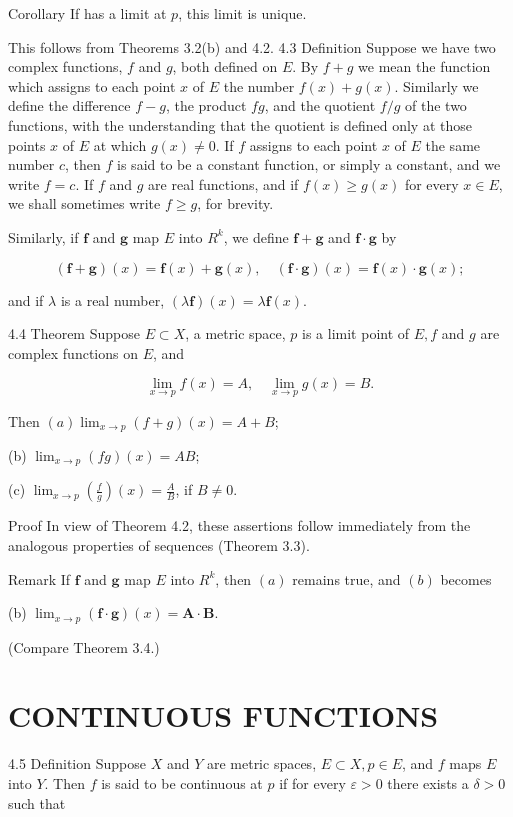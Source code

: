 \documentclass[10pt]{article}
\begin{document}
Corollary If has a limit at $p$, this limit is unique.

This follows from Theorems 3.2(b) and 4.2. 4.3 Definition Suppose we have two complex functions, $f$ and $g$, both defined on $E$. By $f+g$ we mean the function which assigns to each point $x$ of $E$ the number $f(x)+g(x)$. Similarly we define the difference $f-g$, the product $f g$, and the quotient $f / g$ of the two functions, with the understanding that the quotient is defined only at those points $x$ of $E$ at which $g(x) \neq 0$. If $f$ assigns to each point $x$ of $E$ the same number $c$, then $f$ is said to be a constant function, or simply a constant, and we write $f=c$. If $f$ and $g$ are real functions, and if $f(x) \geq g(x)$ for every $x \in E$, we shall sometimes write $f \geq g$, for brevity.

Similarly, if $\mathbf{f}$ and $\mathbf{g}$ map $E$ into $R^{k}$, we define $\mathbf{f}+\mathbf{g}$ and $\mathbf{f} \cdot \mathbf{g}$ by

$$
(\mathbf{f}+\mathbf{g})(x)=\mathbf{f}(x)+\mathbf{g}(x), \quad(\mathbf{f} \cdot \mathbf{g})(x)=\mathbf{f}(x) \cdot \mathbf{g}(x) ;
$$

and if $\lambda$ is a real number, $(\lambda \mathbf{f})(x)=\lambda \mathbf{f}(x)$.

4.4 Theorem Suppose $E \subset X$, a metric space, $p$ is a limit point of $E, f$ and $g$ are complex functions on $E$, and

$$
\lim _{x \rightarrow p} f(x)=A, \quad \lim _{x \rightarrow p} g(x)=B .
$$

Then $(a) \lim _{x \rightarrow p}(f+g)(x)=A+B$;

(b) $\lim _{x \rightarrow p}(f g)(x)=A B$;

(c) $\lim _{x \rightarrow p}\left(\frac{f}{g}\right)(x)=\frac{A}{B}$, if $B \neq 0$.

Proof In view of Theorem 4.2, these assertions follow immediately from the analogous properties of sequences (Theorem 3.3).

Remark If $\mathbf{f}$ and $\mathbf{g}$ map $E$ into $R^{k}$, then $(a)$ remains true, and $(b)$ becomes

(b) $\lim _{x \rightarrow p}(\mathbf{f} \cdot \mathbf{g})(x)=\mathbf{A} \cdot \mathbf{B}$.

(Compare Theorem 3.4.)

\section{CONTINUOUS FUNCTIONS}
4.5 Definition Suppose $X$ and $Y$ are metric spaces, $E \subset X, p \in E$, and $f$ maps $E$ into $Y$. Then $f$ is said to be continuous at $p$ if for every $\varepsilon>0$ there exists a $\delta>0$ such that
\end{document}
